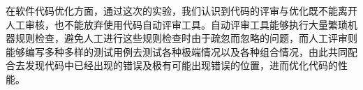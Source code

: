 在软件代码优化方面，通过这次的实验，我们认识到代码的评审与优化既不能离开人工审核，也不能放弃使用代码自动评审工具。自动评审工具能够执行大量繁琐机器规则检查，避免人工进行这些规则检查时由于疏忽而忽略的问题，而人工评审则能够编写多种多样的测试用例去测试各种极端情况以及各种组合情况，由此共同配合去发现代码中已经出现的错误及极有可能出现错误的位置，进而优化代码的性能。

